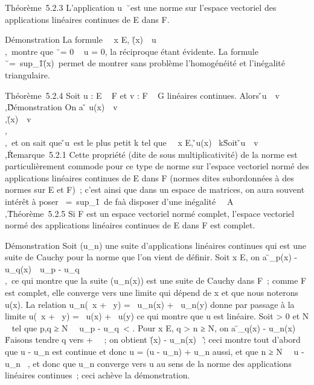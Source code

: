 \documentclass[]{article}
\begin{document}
Théorème~5.2.3 L'application
u\mapsto~\u\
est une norme sur l'espace vectoriel des applications linéaires
continues de E dans F.

Démonstration La formule \forall~~x \in E,
\u(x)\
\leq\
u\\,\x\
montre que \u\ = 0 \rigtharrow~ u
= 0, la réciproque étant évidente. La formule
\u\
=\
sup_\x\=1\u(x)\
permet de montrer sans problème l'homogénéité et l'inégalité
triangulaire.

Théorème~5.2.4 Soit u : E \rightarrow~ F et v : F \rightarrow~ G linéaires continues. Alors
\v \cdot u\
\leq\
v\\,\u\.

Démonstration On a \v \cdot
u(x)\ \leq\
v\\,\u(x)\
\leq\
v\\,\u\\,\x\
et on sait que \v \cdot u\
est le plus petit k tel que \forall~~x \in E,
\v \cdot u(x)\ \leq
k\x\. Soit
\v \cdot u\
\leq\
v\\,\u\.

Remarque~5.2.1 Cette propriété (dite de sous multiplicativité) de la
norme est particulièrement commode pour ce type de norme sur l'espace
vectoriel normé des applications linéaires continues de E dans F (normes
dites subordonnées à des normes sur E et F)~; c'est ainsi que dans un
espace de matrices, on aura souvent intérêt à poser
\A\
=\
sup_\X\=1\AX\
de fa\ccon à disposer d'une inégalité
\AB\
\leq\
A\\,\B\.

Théorème~5.2.5 Si F est un espace vectoriel normé complet, l'espace
vectoriel normé des applications linéaires continues de E dans F est
complet.

Démonstration Soit (u_n) une suite d'applications linéaires
continues qui est une suite de Cauchy pour la norme que l'on vient de
définir. Soit x \in E, on a \u_p(x) -
u_q(x)\ \leq\
u_p -
u_q\\,\x\,
ce qui montre que la suite (u_n(x)) est une suite de Cauchy
dans F~; comme F est complet, elle converge vers une limite qui dépend
de x et que nous noterons u(x). La relation u_n(\alpha~x + \beta~y) =
\alpha~u_n(x) + \beta~u_n(y) donne par passage à la limite u(\alpha~x +
\beta~y) = \alpha~u(x) + \beta~u(y) ce qui montre que u est linéaire. Soit \epsilon
\textgreater{} 0 et N \in {}~ tel que p,q ≥ N \rigtharrow~\
u_p - u_q\ \textless{} \epsilon.
Pour x \in E, q \textgreater{} n ≥ N, on a
\u_q(x) -
u_n(x)\ \leq
\epsilon\x\. Faisons tendre q
vers + \infty~~; on obtient \u(x) -
u_n(x)\ \leq
\epsilon\x\~; ceci montre
tout d'abord que u - u_n est continue et donc u = (u -
u_n) + u_n aussi, et que n ≥ N
\rigtharrow~\ u - u_n\ \leq
\epsilon, et donc que u_n converge vers u au sens de la norme des
applications linéaires continues~; ceci achève la démonstration.
\end{document}
